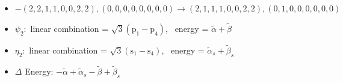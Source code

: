 \documentclass[12pt,a4paper]{article}
\begin{document}
        \begin{itemize}
            \item $- (2, 2, 1, 1, 0, 0, 2, 2), (0, 0, 0, 0, 0, 0, 0, 0) \rightarrow (2, 1, 1, 1, 0, 0, 2, 2), (0, 1, 0, 0, 0, 0, 0, 0)$
        
            \item $\psi_{2}:$ linear combination = $\sqrt{3} \left(\text{p}_{1} - \text{p}_{4}\right)$, \
            energy = $\tilde{\alpha} + \tilde{\beta}$
            
            \item $\eta_{2}:$ linear combination = $\sqrt{3} \left(\text{s}_{1} - \text{s}_{4}\right)$, \
            energy = $\tilde{\alpha}_{s} + \tilde{\beta}_{s}$
            
                \item $\Delta$ Energy: $- \tilde{\alpha} + \tilde{\alpha}_{s} - \tilde{\beta} + \tilde{\beta}_{s}$

\end{itemize}
\end{document}
